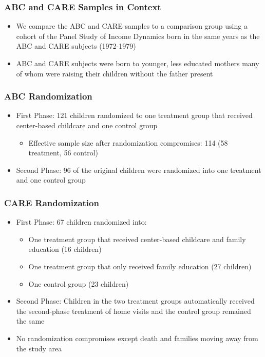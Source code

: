 \documentclass[static]{JJH-Beamer}
\begin{document}
\begin{frame}
 \addtocounter{framenumber}{-1}
\frametitle{ABC and CARE Samples in Context}

\begin{itemize}
\item We compare the ABC and CARE samples to a comparison group using a cohort of the Panel Study of Income Dynamics born in the same years as the ABC and CARE subjects (1972-1979)
\item ABC and CARE subjects were born to younger, less educated mothers many of whom were raising their children without the father present
\end{itemize}

\end{frame}

\begin{frame}
 \addtocounter{framenumber}{-1}
\frametitle{ABC Randomization}

\begin{itemize}
\item First Phase: 121 children randomized to one treatment group that received center-based childcare and one control group
	\begin{itemize}
	\item Effective sample size after randomization compromises: 114 (58 treatment, 56 control)
	\end{itemize}
\item Second Phase: 96 of the original children were randomized into one treatment and one control group
\end{itemize}

\end{frame}

\begin{frame}
 \addtocounter{framenumber}{-1}
\frametitle{CARE Randomization}

\begin{itemize}
\item First Phase: 67 children randomized into:
	\begin{itemize}
	\item One treatment group that received center-based childcare and family education (16 children)
	\item One treatment group that only received family education (27 children)
	\item One control group (23 children)
	\end{itemize}
\item Second Phase: Children in the two treatment groups automatically received the second-phase treatment of home visits and the control group remained the same
\item No randomization compromises except death and families moving away from the study area
\end{itemize}

\end{frame}
\end{document}
